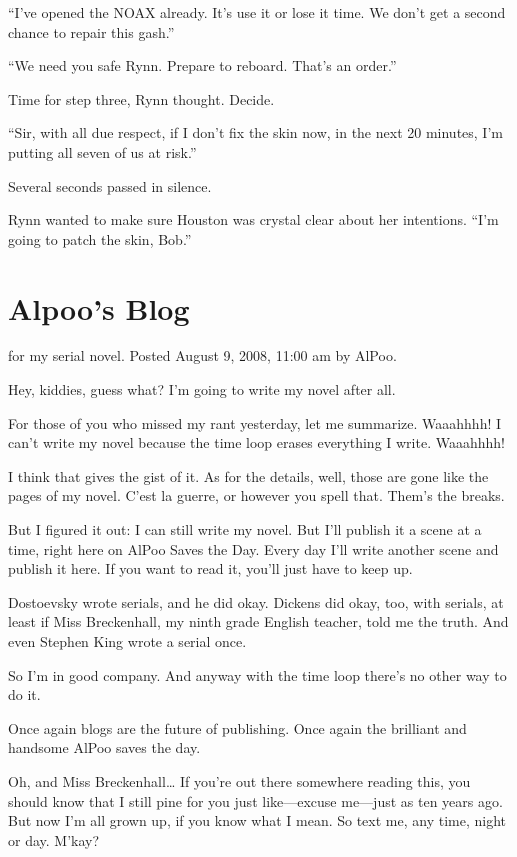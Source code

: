 “I’ve opened the NOAX already. It’s use it or lose it time. We don’t get a second chance to repair this gash.”

“We need you safe Rynn. Prepare to reboard. That’s an order.”

Time for step three, Rynn thought. Decide.

“Sir, with all due respect, if I don’t fix the skin now, in the next 20 minutes, I’m putting all seven of us at risk.”

Several seconds passed in silence.

Rynn wanted to make sure Houston was crystal clear about her intentions. “I’m going to patch the skin, Bob.”



\section{Alpoo’s Blog}

 for my serial novel. Posted August 9, 2008, 11:00 am by AlPoo.

Hey, kiddies, guess what? I’m going to write my novel after all.

For those of you who missed my rant yesterday, let me summarize. Waaahhhh! I can’t write my novel because the time loop erases everything I write. Waaahhhh!

I think that gives the gist of it. As for the details, well, those are gone like the pages of my novel. C’est la guerre, or however you spell that. Them’s the breaks.

But I figured it out: I can still write my novel. But I’ll publish it a scene at a time, right here on AlPoo Saves the Day. Every day I’ll write another scene and publish it here. If you want to read it, you’ll just have to keep up.

Dostoevsky wrote serials, and he did okay. Dickens did okay, too, with serials, at least if Miss Breckenhall, my ninth grade English teacher, told me the truth. And even Stephen King wrote a serial once.

So I’m in good company. And anyway with the time loop there’s no other way to do it.

Once again blogs are the future of publishing. Once again the brilliant and handsome AlPoo saves the day.

Oh, and Miss Breckenhall… If you’re out there somewhere reading this, you should know that I still pine for you just like—excuse me—just as ten years ago. But now I’m all grown up, if you know what I mean. So text me, any time, night or day. M’kay?

